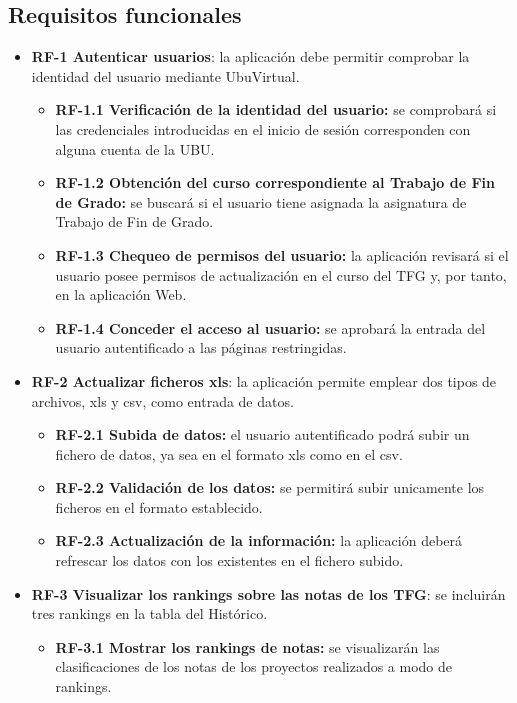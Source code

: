 \subsection{Requisitos funcionales}
\begin{itemize}
	\item \textbf{RF-1 Autenticar usuarios}: la aplicación debe permitir comprobar la identidad del usuario mediante UbuVirtual.
	\begin{itemize}
		\item \textbf{RF-1.1 Verificación de la identidad del usuario:} se comprobará si las credenciales introducidas en el inicio de sesión corresponden con alguna cuenta de la UBU.
		\item \textbf{RF-1.2 Obtención del curso correspondiente al Trabajo de Fin de Grado:} se buscará si el usuario tiene asignada la asignatura de Trabajo de Fin de Grado.
		\item \textbf{RF-1.3 Chequeo de permisos del usuario:} la aplicación revisará si el usuario posee permisos de actualización en el curso del TFG y, por tanto, en la aplicación Web.
		\item \textbf{RF-1.4 Conceder el acceso al usuario:} se aprobará la entrada del usuario autentificado a las páginas restringidas.
	\end{itemize}
	\item \textbf{RF-2 Actualizar ficheros xls}: la aplicación permite emplear dos tipos de archivos, xls y csv, como entrada de datos.
	\begin{itemize}
		\item \textbf{RF-2.1 Subida de datos:} el usuario autentificado podrá subir un fichero de datos, ya sea en el formato xls como en el csv. 
		\item \textbf{RF-2.2 Validación de los datos:} se permitirá subir unicamente los ficheros en el formato establecido.
		\item \textbf{RF-2.3 Actualización de la información:} la aplicación deberá refrescar los datos con los existentes en el fichero subido.
	\end{itemize}
	\item \textbf{RF-3 Visualizar los rankings sobre las notas de los TFG}: se incluirán tres rankings en la tabla del Histórico.
	\begin{itemize}
		\item \textbf{RF-3.1 Mostrar los rankings de notas:} se visualizarán las clasificaciones de los notas de los proyectos realizados a modo de rankings.
	\end{itemize}	
\end{itemize}

